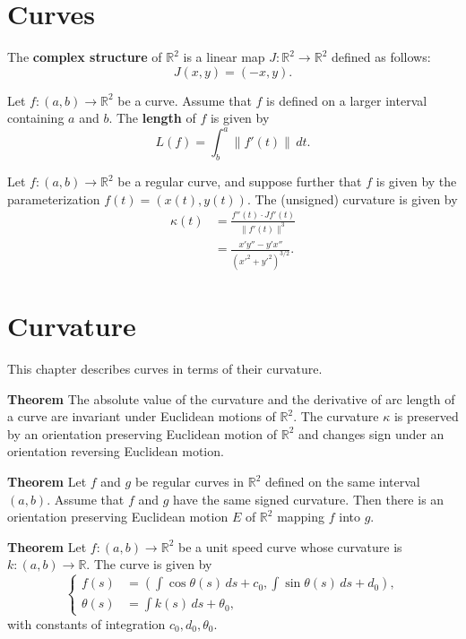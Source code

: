 \documentclass{book}
\begin{document}
	\chapter{Curves}
	
		The \textbf{complex structure} of $\mathbb{R}^2$ is a linear map $J:\mathbb{R}^2\rightarrow\mathbb{R}^2$ defined as follows:
		\begin{equation}
			J(x,y)=(-x,y)\mathrm{.}
		\end{equation} 
		
		Let $f:(a,b)\rightarrow\mathbb{R}^2$ be a curve. Assume that $f$ is defined on a larger interval containing $a$ and $b$. The \textbf{length} of $f$ is given by
		\begin{equation}
			L(f)=\int^a_b{\|f'(t)\|\,dt}\mathrm{.}
		\end{equation}
		
		Let $f:(a,b)\rightarrow\mathbb{R}^2$ be a regular curve, and suppose further that $f$ is given by the parameterization $f(t)=(x(t),y(t))$. The (unsigned) curvature is given by
		\begin{align}
			\kappa(t)&=\frac{f''(t)\cdot Jf'(t)}{\|f'(t)\|^3}\\
			&=\frac{x'y''-y'x''}{(x'^2+y'^2)^{3/2}}\mathrm{.}
		\end{align}
		
	\chapter{Curvature}
		This chapter describes curves in terms of their curvature.
	
		\textbf{Theorem} The absolute value of the curvature and the derivative of arc length of a curve are invariant under Euclidean motions of $\mathbb{R}^2$. The curvature $\kappa$ is preserved by an orientation preserving Euclidean motion of $\mathbb{R}^2$ and changes sign under an orientation reversing Euclidean motion.
		
		\textbf{Theorem} Let $f$ and $g$ be regular curves in $\mathbb{R}^2$ defined on the same interval $(a,b)$. Assume that $f$ and $g$ have the same signed curvature. Then there is an orientation preserving Euclidean motion $E$ of $\mathbb{R}^2$ mapping $f$ into $g$.
		
		\textbf{Theorem} Let $f:(a,b)\rightarrow\mathbb{R}^2$ be a unit speed curve whose curvature is $k:(a,b)\rightarrow\mathbb{R}$. The curve is given by
		\begin{equation*}
			\left\{
			\begin{aligned}
				f(s)&=\left(\int\cos{\theta(s)\,ds}+c_0,\int\sin{\theta(s)\,ds+d_0}\right),\\
				\theta(s)&=\int{k(s)\,ds}+\theta_0,
			\end{aligned}
			\right.
		\end{equation*}
		with constants of integration $c_0, d_0, \theta_0$.		
\end{document}
